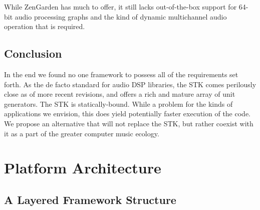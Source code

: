\documentclass[twoside,10pt]{article}
\begin{document}
While ZenGarden has much to offer, it still lacks out-of-the-box support for 64-bit audio processing graphs and the kind of dynamic multichannel audio operation that is required.



\subsection{Conclusion} %

In the end we found no one framework to possess all of the requirements set forth.  As the de facto standard for audio DSP libraries, the STK comes perilously close as of more recent revisions\cite{Scavone:2005}, and offers a rich and mature array of unit generators.  The STK is statically-bound.  While a problem for the kinds of applications we envision, this does yield potentially faster execution of the code.  We propose an alternative that will not replace the STK, but rather coexist with it as a part of the greater computer music ecology.


%






\section{Platform Architecture} %

\subsection{A Layered Framework Structure}
\end{document}

